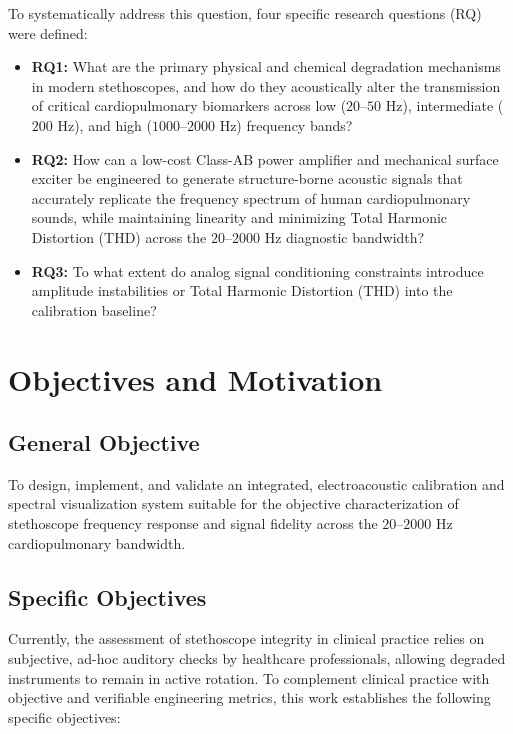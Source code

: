 To systematically address this question, four specific research questions (RQ) were defined:

\begin{itemize}
    \item \textbf{RQ1:} What are the primary physical and chemical degradation mechanisms in modern stethoscopes, and how do they acoustically alter the transmission of critical cardiopulmonary biomarkers across low ($20\text{--}50\text{ Hz}$), intermediate ($200\text{ Hz}$), and high ($1000\text{--}2000\text{ Hz}$) frequency bands?
    \item \textbf{RQ2:} How can a low-cost Class-AB power amplifier and mechanical surface exciter be engineered to generate structure-borne acoustic signals that accurately replicate the frequency spectrum of human cardiopulmonary sounds, while maintaining linearity and minimizing Total Harmonic Distortion (THD) across the $20\text{--}2000\text{ Hz}$ diagnostic bandwidth?
    \item \textbf{RQ3:} To what extent do analog signal conditioning constraints introduce amplitude instabilities or Total Harmonic Distortion (THD) into the calibration baseline?
\end{itemize}

\section{Objectives and Motivation}

\subsection*{General Objective}
To design, implement, and validate an integrated, electroacoustic calibration and spectral visualization system suitable for the objective characterization of stethoscope frequency response and signal fidelity across the $20\text{--}2000\text{ Hz}$ cardiopulmonary bandwidth.

\subsection*{Specific Objectives}
Currently, the assessment of stethoscope integrity in clinical practice relies on subjective, ad-hoc auditory checks by healthcare professionals, allowing degraded instruments to remain in active rotation. To complement clinical practice with objective and verifiable engineering metrics, this work establishes the following specific objectives:

